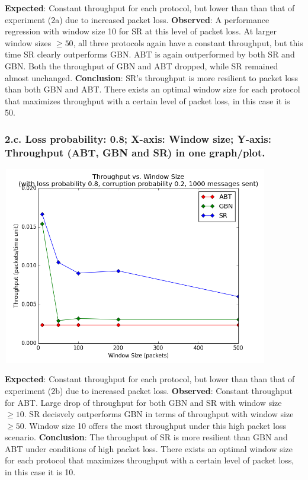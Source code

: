 \documentclass{article}
\begin{document}
\textbf{Expected}: Constant throughput for each protocol, but lower than than that of experiment (2a) due to increased packet loss.
\newline\newline
\textbf{Observed}: A performance regression with window size 10 for SR at this level of packet loss. At larger window sizes $\ge 50$, all three protocols again have a constant throughput, but this time SR clearly outperforms GBN. ABT is again outperformed by both SR and GBN. Both the throughput of GBN and ABT dropped, while SR remained almost unchanged.
\newline\newline
\textbf{Conclusion}: SR's throughput is more resilient to packet loss than both GBN and ABT. There exists an optimal window size for each protocol that maximizes throughput with a certain level of packet loss, in this case it is 50.

\pagebreak

\subsubsection{2.c. Loss probability: 0.8; X-axis: Window size; Y-axis: Throughput (ABT, GBN and SR) in one graph/plot.}

\begin{center}
    \includegraphics[width=330pt,height=245pt]{images/exp2g3.png}
\end{center}

\textbf{Expected}: Constant throughput for each protocol, but lower than than that of experiment (2b) due to increased packet loss.
\newline\newline
\textbf{Observed}: Constant throughput for ABT. Large drop of throughput for both GBN and SR with window size $\ge 10$. SR decisvely outperforms GBN in terms of throughput with window size $\ge 50$. Window size 10 offers the most throughput under this high packet loss scenario.
\newline\newline
\textbf{Conclusion}: The throughput of SR is more resilient than GBN and ABT under conditions of high packet loss. There exists an optimal window size for each protocol that maximizes throughput with a certain level of packet loss, in this case it is 10.
\end{document}
